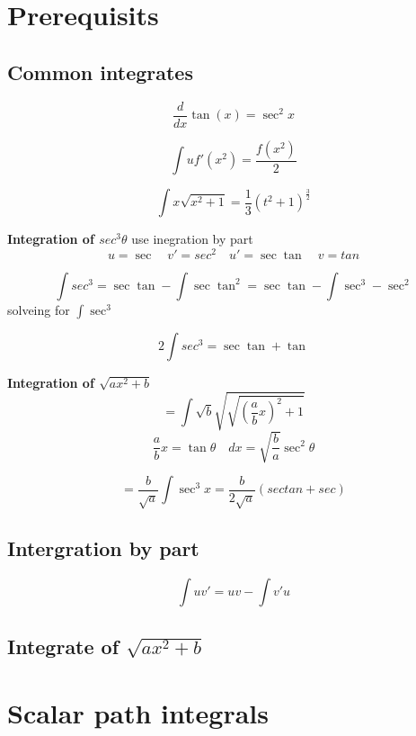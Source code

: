 \documentclass[]{article}
\date{}
\begin{document}
\hypertarget{prerequisits}{%
\section{Prerequisits}\label{prerequisits}}

\hypertarget{common-integrates}{%
\subsection{Common integrates}\label{common-integrates}}

\[\frac{d}{dx}\tan(x) = \sec^2 x\]

\[\int u f'(x^2)=\frac{f(x^2)}{2}\]

\[\int x\sqrt{x^2 + 1}=\frac{1}{3}(t^2+1)^{\frac{3}{2}}\]

\textbf{Integration of \(sec^3{\theta}\)} use inegration by part
\[u=\sec \quad v'=sec^2 \quad u' = \sec\tan \quad v = tan\]

\[\int{sec^3}=\sec \tan - \int{\sec \tan^2} = \sec\tan - \int \sec^3 -\sec^2\]
solveing for \(\int \sec^3\)

\[2\int sec^3= \sec \tan + \tan\]

\textbf{Integration of \(\sqrt{ax^2 + b}\)}
\[=\int \sqrt{b}\sqrt{\sqrt{ \left( \frac{a}{b}x \right)^2+1}}\]
\[\frac{a}{b}x=\tan{\theta} \quad  dx = \sqrt{\frac{b}{a}} \sec^2{\theta}\]

\[=\frac{b}{\sqrt{a}} \int \sec^3{x} = \frac{b}{2 \sqrt{a}}\left( sec tan + sec\right)\]

\hypertarget{intergration-by-part}{%
\subsection{Intergration by part}\label{intergration-by-part}}

\[\int uv' = uv- \int v'u\]

\hypertarget{integrate-of-sqrtax2-b}{%
\subsection{\texorpdfstring{Integrate of
\(\sqrt{ax^2 + b}\)}{Integrate of \textbackslash{}sqrt\{ax\^{}2 + b\}}}\label{integrate-of-sqrtax2-b}}

\hypertarget{scalar-path-integrals}{%
\section{Scalar path integrals}\label{scalar-path-integrals}}
\end{document}
